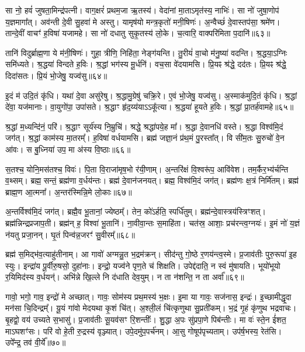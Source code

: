 सा नो॒ हवं॑ जुषता॒मिन्द्र॑पत्नी।
वाग॒क्षरं॑ प्रथम॒जा ऋ॒तस्य॑।
वेदा॑नां मा॒ता\-ऽमृत॑स्य॒ नाभिः॑।
सा नो॑ जुषा॒णोप॑ य॒ज्ञमागा᳚त्।
अव॑न्ती दे॒वी सु॒हवा॑ मे अस्तु।
यामृष॑यो मन्त्र॒कृतो॑ मनी॒षिणः॑।
अ॒न्वैच्छं॑ दे॒वास्तप॑सा॒ श्रमे॑ण।
तान्दे॒वीं वाचꣳ॑ ह॒विषा॑ यजामहे।
सा नो॑ दधातु सुकृ॒तस्य॑ लो॒के।
च॒त्वारि॒ वाक्परि॑मिता प॒दानि॑॥६३॥

तानि॑ विदुर्ब्राह्म॒णा ये म॑नी॒षिणः॑।
गुहा॒ त्रीणि॒ निहि॑ता॒ नेङ्ग॑यन्ति।
तु॒रीयं॑ वा॒चो म॑नु॒ष्या॑ वदन्ति।
श्र॒द्धया॒\-ऽग्निः समि॑ध्यते।
श्र॒द्धया॑ विन्दते ह॒विः।
श्र॒द्धां भग॑स्य मू॒र्धनि॑।
वच॒सा वे॑दयामसि।
प्रि॒यꣴ श्र॑द्धे॒ दद॑तः।
प्रि॒यꣴ श्र॑द्धे॒ दिदा॑सतः।
प्रि॒यं भो॒जेषु॒ यज्व॑सु॥६४॥

इ॒दं म॑ उदि॒तं कृ॑धि।
यथा॑ दे॒वा असु॑रेषु।
श्र॒द्धामु॒ग्रेषु॑ चक्रि॒रे।
ए॒वं भो॒जेषु॒ यज्व॑सु।
अ॒स्माक॑मुदि॒तं कृ॑धि।
श्र॒द्धां दे॑वा॒ यज॑मानाः।
वा॒युगो॑पा॒ उपा॑सते।
श्र॒द्धाꣳ हृ॑द॒य्य॑या\-ऽऽकू᳚त्या।
श्र॒द्धया॑ हूयते ह॒विः।
श्र॒द्धां प्रा॒तर्\mbox{}ह॑वामहे॥६५॥

श्र॒द्धां म॒ध्यन्दि॑नं॒ परि॑।
श्र॒द्धाꣳ सूर्य॑स्य नि॒म्रुचि॑।
श्रद्धे॒ श्रद्धा॑पये॒ह मा᳚।
श्र॒द्धा दे॒वानधि॑ वस्ते।
श्र॒द्धा विश्व॑मि॒दं जग॑त्।
श्र॒द्धां काम॑स्य मा॒तरम्᳚।
ह॒विषा॑ वर्धयामसि।
ब्रह्म॑ जज्ञा॒नं प्र॑थ॒मं पु॒रस्ता᳚त्।
वि सी॑म॒तः सु॒रुचो॑ वे॒न आ॑वः।
स बु॒ध्निया॑ उप॒ मा अ॑स्य वि॒ष्ठाः॥६६॥

स॒तश्च॒ योनि॒मस॑तश्च॒ विवः॑।
पि॒ता वि॒राजा॑मृष॒भो र॑यी॒णाम्।
अ॒न्तरि॑क्षं वि॒श्वरू॑प॒ आवि॑वेश।
तम॒र्कैर॒भ्य॑र्चन्ति व॒थ्सम्।
ब्रह्म॒ सन्तं॒ ब्रह्म॑णा व॒र्धय॑न्तः।
ब्रह्म॑ दे॒वान॑जनयत्।
ब्रह्म॒ विश्व॑मि॒दं जग॑त्।
ब्रह्म॑णः क्ष॒त्रं निर्मि॑तम्।
ब्रह्म॑ ब्राह्म॒ण आ॒त्मना᳚।
अ॒न्तर॑स्मिन्नि॒मे लो॒काः॥६७॥

अ॒न्तर्विश्व॑मि॒दं जग॑त्।
ब्रह्मै॒व भू॒तानां॒ ज्येष्ठम्᳚।
तेन॒ को॑\-ऽर्\mbox{}हति॒ स्पर्धि॑तुम्।
ब्रह्म॑न्दे॒वास्त्रय॑स्त्रिꣳशत्।
ब्रह्म॑न्निन्द्रप्रजाप॒ती।
ब्रह्म॑न् ह॒ विश्वा॑ भू॒तानि॑।
ना॒वीवा॒न्तः स॒माहि॑ता।
चत॑स्र॒ आशाः॒ प्रच॑रन्त्व॒ग्नयः॑।
इ॒मं नो॑ य॒ज्ञं न॑यतु प्रजा॒नन्।
घृ॒तं पिन्व॑न्न॒जरꣳ॑ सु॒वीरम्᳚॥६८॥

ब्रह्म॑ स॒मिद्भ॑व॒त्याहु॑तीनाम्।
आ गावो॑ अग्मन्नु॒त भ॒द्रम॑क्रन्।
सीद॑न्तु गो॒ष्ठे र॒णय॑न्त्व॒स्मे।
प्र॒जाव॑तीः पुरु॒रूपा॑ इ॒ह स्युः।
इन्द्रा॑य पू॒र्वीरु॒षसो॒ दुहा॑नाः।
इन्द्रो॒ यज्व॑ने पृण॒ते च॑ शिक्षति।
उपेद्द॑दाति॒ न स्वं मु॑षायति।
भूयो॑भूयो र॒यिमिद॑स्य व॒र्धयन्॑।
अभि॑न्ने खि॒ल्ले नि द॑धाति देव॒युम्।
न ता न॑शन्ति॒ न ता अर्वा᳚॥६९॥

गावो॒ भगो॒ गाव॒ इन्द्रो॑ मे अच्छात्।
गावः॒ सोम॑स्य प्रथ॒मस्य॑ भ॒क्षः।
इ॒मा या गावः॒ सज॑नास॒ इन्द्रः॑।
इ॒च्छामीद्धृ॒दा मन॑सा चि॒दिन्द्रम्᳚।
यू॒यं गा॑वो मेदयथा कृ॒शं चि॑त्।
अ॒श्ली॒लं चि॑त्कृणुथा सु॒प्रती॑कम्।
भ॒द्रं गृ॒हं कृ॑णुथ भद्रवाचः।
बृ॒हद्वो॒ वय॑ उच्यते स॒भासु॑।
प्र॒जाव॑तीः सू॒यव॑सꣳ रि॒शन्तीः᳚।
शु॒द्धा अ॒पः सु॑प्रपा॒णे पिब॑न्तीः।
मा वः॑ स्ते॒न ई॑शत॒ माऽघशꣳ॑सः।
परि॑ वो हे॒ती रु॒द्रस्य॑ वृञ्ज्यात्।
उपे॒दमु॑प॒पर्च॑नम्।
आ॒सु गोषूप॑पृच्यताम्।
उप॑र्\mbox{}ष॒भस्य॒ रेत॑सि।
उपे᳚न्द्र॒ तव॑ वी॒र्ये᳚॥७०॥\anuvakamend[च॒रा॒मि॒ कनी॑यो॒\-ऽन्यानर्पि॑ता प॒दानि॒ यज्व॑सु हवामहे वि॒ष्ठा लो॒काः सु॒वीर॒मर्वा॒ पिब॑न्तीः॒ षट्च॑]

